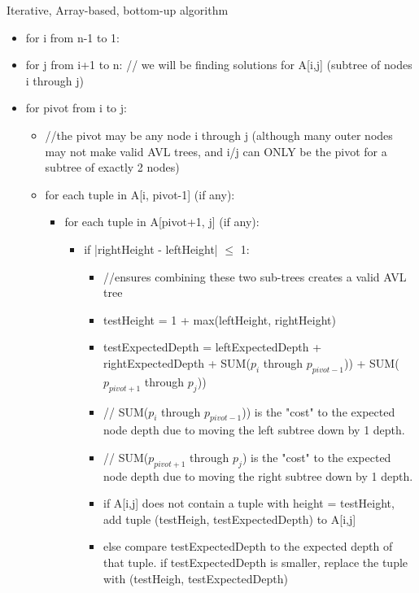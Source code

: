 \documentclass[a4paper]{article}
\begin{document}
Iterative, Array-based, bottom-up algorithm
\begin{itemize}
\item for i from n-1 to 1:
\item for j from i+1 to n: // we will be finding solutions for A[i,j] (subtree of nodes i through j)
\item for pivot from i to j: 
    \begin{itemize}
    \item //the pivot may be any node i through j (although many outer nodes may not make valid AVL trees, and i/j can ONLY be the pivot for a subtree of exactly 2 nodes)
    \item for each tuple in A[i, pivot-1] (if any):
        \begin{itemize}
        \item for each tuple in A[pivot+1, j] (if any):
            \begin{itemize}
            \item if |rightHeight - leftHeight| $\leq$ 1: 
                \begin{itemize}
                \item //ensures combining these two sub-trees creates a valid AVL tree
                \item testHeight = 1 + max(leftHeight, rightHeight)
                \item testExpectedDepth = leftExpectedDepth + rightExpectedDepth + SUM($p_i$ through $p_{pivot-1}$)) + SUM($p_{pivot+1}$ through $p_{j}$))
                \item //  SUM($p_i$ through $p_{pivot-1}$)) is the "cost" to the expected node depth due to moving the left subtree down by 1 depth.
                \item // SUM($p_{pivot+1}$ through $p_{j}$) is the "cost" to the expected node depth due to moving the right subtree down by 1 depth.
                \item if A[i,j] does not contain a tuple with height = testHeight, add tuple (testHeigh, testExpectedDepth) to A[i,j]
                \item else compare testExpectedDepth to the expected depth of that tuple. if testExpectedDepth is smaller, replace the tuple with (testHeigh, testExpectedDepth)
                \end{itemize}
            \end{itemize}
        \end{itemize}
    \end{itemize}
\end{itemize}
                        
\end{document}
